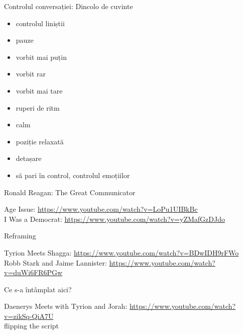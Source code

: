 \documentclass{simple}
\begin{document}
\begin{frame}{Controlul conversației: Dincolo de cuvinte}
  \begin{itemize}
    \pause
    \item controlul liniștii
    \pause
    \item pauze
    \pause
    \item vorbit mai puțin
    \pause
    \item vorbit rar
    \pause
    \item vorbit mai tare
    \pause
    \item ruperi de ritm
    \pause
    \item calm
    \pause
    \item poziție relaxată
    \pause
    \item detașare
    \pause
    \item să pari în control, controlul emoțiilor
  \end{itemize}
\end{frame}

\begin{frame}{Ronald Reagan: The Great Communicator}
  \begin{center}
    \scriptsize
    Age Issue: \url{https://www.youtube.com/watch?v=LoPu1UIBkBc}\\
    \vspace{3mm}
    I Was a Democrat: \url{https://www.youtube.com/watch?v=yZMafGzDJdo}
  \end{center}
\end{frame}

\begin{frame}{Reframing}
  \begin{center}
    \scriptsize
    Tyrion Meets Shagga: \url{https://www.youtube.com/watch?v=BDwIDH9rFWo}\\
    \vspace{3mm}
    Robb Stark and Jaime Lannister: \url{https://www.youtube.com/watch?v=duWi6FR6PGw}
  \end{center}
\end{frame}

\begin{frame}{Ce s-a întâmplat aici?}
  \begin{center}
    \scriptsize
    Daenerys Meets with Tyrion and Jorah: \url{https://www.youtube.com/watch?v=zikSq-QiA7U}\\
    \vspace{1cm}
    \normalsize
    \pause
    flipping the script
  \end{center}
\end{frame}
\end{document}
